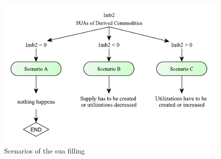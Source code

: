 \documentclass[]{article}
\begin{document}
\begin{figure}

{\centering \includegraphics[width=0.8\linewidth]{images/05_ScenariosFilling} 

}

\caption{\label{fig:f5}Scenarios of the sua filling}\label{fig:f5}
\end{figure}
\end{document}
